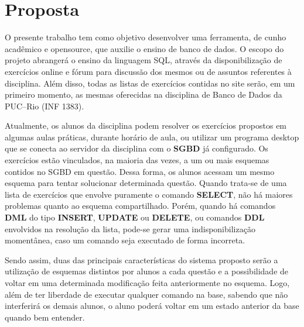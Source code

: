 \documentclass[graduacao,brazil]{ThesisPUC}
\begin{document}

\chapter{Proposta}

O presente trabalho tem como objetivo desenvolver uma ferramenta, de cunho acad\^{e}mico
e opensource, que auxilie o ensino de banco de dados. O escopo do projeto abranger\'{a} o ensino
da linguagem SQL, atrav\'{e}s da disponibiliza\c{c}\~{a}o de exerc\'{i}cios online e f\'{o}rum para discuss\~{a}o dos
mesmos ou de assuntos referentes \`{a} disciplina. Al\'{e}m disso, todas as listas de exerc\'{i}cios contidas
no site ser\~{a}o, em um primeiro momento, as mesmas oferecidas na disciplina de Banco de Dados
da PUC--Rio (INF 1383).

Atualmente, os alunos da disciplina podem resolver os exerc\'{i}cios propostos em algumas
aulas pr\'{a}ticas, durante hor\'{a}rio de aula, ou utilizar um programa desktop que se conecta ao
servidor da disciplina com o \textbf{SGBD} \cite{ElmasriNavathe05} j\'{a} configurado. 
Os exerc\'{i}cios est\~{a}o vinculados, na maioria das vezes, a um ou mais esquemas contidos no SGBD 
em quest\~{a}o. Dessa forma, os alunos acessam um mesmo esquema para tentar solucionar determinada quest\~{a}o.
Quando trata-se de uma lista de exerc\'{i}cios que envolve puramente o comando \textbf{SELECT}, n\~{a}o h\'{a}
maiores problemas quanto ao esquema compartilhado.
Por\'{e}m, quando h\'{a} comandos \textbf{DML}\cite{ElmasriNavathe05} do tipo \textbf{INSERT}, \textbf{UPDATE} ou
\textbf{DELETE}, ou comandos \textbf{DDL}\cite{ElmasriNavathe05} envolvidos na resolu\c{c}\~{a}o da lista, pode-se
gerar uma indisponibiliza\c{c}\~{a}o moment\^{a}nea, caso um comando seja executado de forma incorreta.

Sendo assim, duas das principais caracter\'{i}sticas do sistema proposto ser\~{a}o a utiliza\c{c}\~{a}o de
esquemas distintos por alunos a cada quest\~{a}o e a possibilidade de voltar em uma determinada
modifica\c{c}\~{a}o feita anteriormente no esquema. Logo, al\'{e}m de ter liberdade de executar qualquer
comando na base, sabendo que n\~{a}o interferir\'{a} os demais alunos, o aluno poder\'{a} voltar em um
estado anterior da base quando bem entender.
\end{document}
